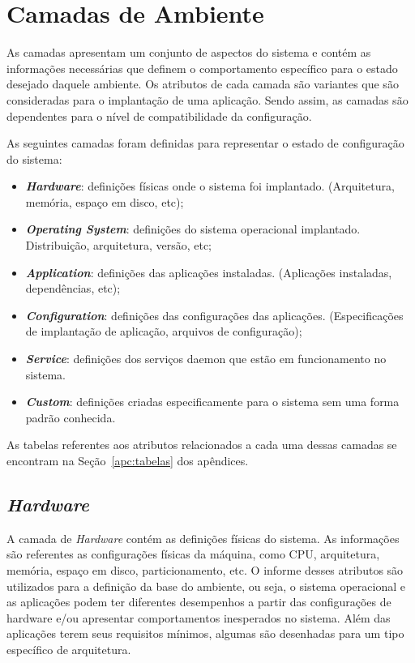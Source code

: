 \section{Camadas de Ambiente}
\label{sec:cam-amb}

As camadas apresentam um conjunto de aspectos do sistema e contém as
informações necessárias que definem o comportamento específico para o
estado desejado daquele ambiente. Os atributos de cada camada são variantes
que são consideradas para o implantação de uma aplicação. Sendo assim, as
camadas são dependentes para o nível de compatibilidade da configuração.

As seguintes camadas foram definidas para representar o estado de configuração do
sistema:
\begin{itemize}
  \item \textit{\textbf{Hardware}}: definições físicas onde o sistema foi implantado.
    (Arquitetura, memória, espaço em disco, etc);
  \item \textit{\textbf{Operating System}}: definições do sistema operacional
    implantado. Distribuição, arquitetura, versão, etc;
  \item \textit{\textbf{Application}}: definições das aplicações instaladas.
    (Aplicações instaladas, dependências, etc);
  \item \textit{\textbf{Configuration}}: definições das configurações das
    aplicações. (Especificações de implantação de aplicação, arquivos
    de configuração);
  \item \textit{\textbf{Service}}: definições dos serviços daemon que estão em
    funcionamento no sistema.
  \item \textit{\textbf{Custom}}: definições criadas especificamente para o
    sistema sem uma forma padrão conhecida.
\end{itemize}

As tabelas referentes aos atributos relacionados a cada uma dessas camadas se
encontram na Seção~\ref{apc:tabelas} dos apêndices.

\subsection{\textit{Hardware}}
\label{sec:cam-hard}

A camada de \textit{Hardware} contém as definições físicas do sistema.
As informações são referentes as configurações físicas da máquina, como
CPU, arquitetura, memória, espaço em disco, particionamento, etc. O informe desses atributos
são utilizados para a definição da base do ambiente, ou seja, o sistema
operacional e as aplicações podem ter diferentes desempenhos a partir das
configurações de hardware e/ou apresentar comportamentos inesperados no sistema.
Além das aplicações terem seus requisitos mínimos, algumas são desenhadas
para um tipo específico de arquitetura.

